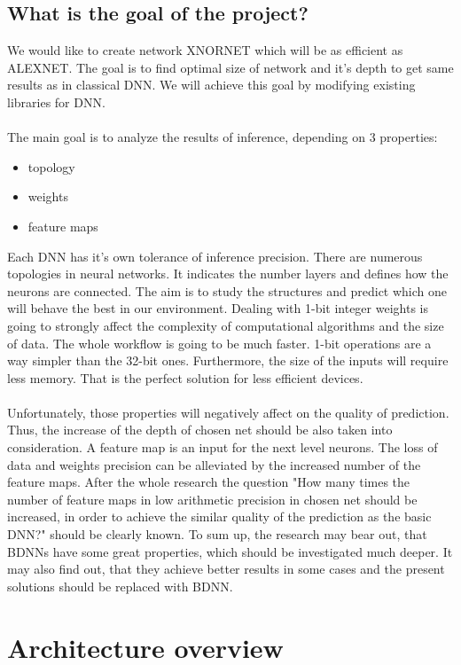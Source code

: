 \documentclass[licencjacka]{pracamgr}
\begin{document}
	\section{What is the goal of the project?}

	We would like to create network XNORNET which will be as efficient as ALEXNET. The goal is to find optimal size of network and it’s depth to get same results as in classical DNN.  
	We will achieve this goal by modifying existing libraries for DNN.
	\\\\
	The main goal is to analyze the results of inference, depending on 3 properties: 
	\begin{itemize}
	\item topology
	\item weights
	\item feature maps
	\end{itemize}

	Each DNN has it’s own tolerance of inference precision. There are numerous topologies in neural networks. It indicates the number layers and defines how the neurons are connected. The aim is to study the structures and predict which one will behave the best in our environment. Dealing with 1-bit integer weights is going to strongly affect the complexity of computational algorithms and the size of data. The whole workflow is going to be much faster. 1-bit operations are a way simpler than the 32-bit ones. Furthermore, the size of the inputs will require less memory. That is the perfect solution for less efficient devices. 
	\\\\
	Unfortunately, those properties will negatively affect on the quality of prediction. Thus, the increase of the depth of chosen net should be also taken into consideration. A feature map is an input for the next level neurons.  The loss of data and weights precision can be alleviated by the increased number of the feature maps. After the whole research the question "How many times the number of feature maps in low arithmetic precision in chosen net should be increased, in order to achieve the similar quality of the prediction as the basic DNN?" should be clearly known. To sum up, the research may bear out, that BDNNs have some great properties, which should be investigated much deeper. It may also find out, that they achieve better results in some cases and the present solutions should be replaced with BDNN.


\chapter{Architecture overview}
\end{document}
